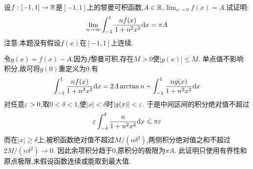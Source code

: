\documentclass{ctexart}
\begin{document}
\begin{problem}[8.(15\songti{分})]
设$f:[-1,1]\to\mathbb{R}$是$[-1,1]$上的黎曼可积函数,$A\in\mathbb{R}$,$\displaystyle\lim_{x\to0}f(x)=A$.试证明:
        \[\lim_{n\to\infty}\int_{-1}^{1}\dfrac{nf(x)}{1+n^2x^2}\mathrm{d} x=\pi A\]
        注意:本题没有假设$f(x)$在$[-1,1]$上连续.
\end{problem}
\begin{solution}
令$g(x)=f(x)-A$.因为$f$黎曼可积,存在$M>0$使$|g(x)|\leqslant M$.
单点值不影响积分,故可将$g(0)$重定义为$0$.有
\[\int_{-1}^1\dfrac{nf(x)}{1+n^2x^2}\mathrm{d} x
=2A\arctan n+\int_{-1}^1\dfrac{ng(x)}{1+n^2x^2}\mathrm{d} x\]
对任意$\varepsilon>0$,取$0<\delta<1$,使$|x|<\delta$时$|g(x)|<\varepsilon$.
于是中间区间的积分绝对值不超过
\[\varepsilon\int_{-\delta}^{\delta}\dfrac{n}{1+n^2x^2}\mathrm{d} x\leqslant\pi\varepsilon\]
而在$|x|\geqslant\delta$上,被积函数绝对值不超过$M/(n\delta^2)$,两侧积分绝对值之和不超过$2M/(n\delta^2)\to0$.
因此余项积分趋于$0$,原积分的极限为$\pi A$.
此证明只使用有界性和原点极限,未假设函数连续或能取到最大值.
\end{solution}
\end{document}
